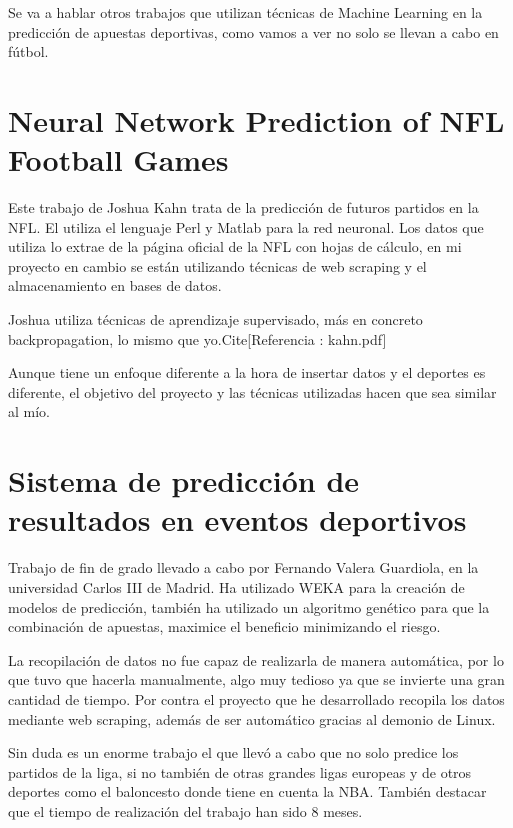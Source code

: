 
Se va a hablar otros trabajos que utilizan técnicas de Machine Learning en la predicción de apuestas deportivas, como vamos a ver no solo se llevan a cabo en fútbol.

\section{Neural Network Prediction of NFL Football Games}

Este trabajo de Joshua Kahn trata de la predicción de futuros partidos en la NFL.
El utiliza el lenguaje Perl y Matlab para la red neuronal. Los datos que utiliza lo extrae de la página oficial de la NFL con hojas de cálculo, en mi proyecto en cambio se están utilizando técnicas de web scraping y el almacenamiento en bases de datos.

Joshua utiliza técnicas de aprendizaje supervisado, más en concreto backpropagation, lo mismo que yo.Cite[Referencia : kahn.pdf]

Aunque tiene un enfoque diferente a la hora de insertar datos y el deportes es diferente, el objetivo del proyecto y las técnicas utilizadas hacen que sea similar al mío.

\section{Sistema de predicción de resultados en eventos deportivos}

Trabajo de fin de grado llevado a cabo por Fernando Valera Guardiola, en la universidad Carlos III de Madrid. Ha utilizado WEKA para la creación de modelos de predicción, también ha utilizado un algoritmo genético para que la combinación de apuestas, maximice el beneficio minimizando el riesgo.

La recopilación de datos no fue capaz de realizarla de manera automática, por lo que tuvo que hacerla manualmente, algo muy tedioso ya que se invierte una gran cantidad de tiempo. Por contra el proyecto que he desarrollado recopila los datos mediante web scraping, además de ser automático gracias al demonio de Linux.

Sin duda es un enorme trabajo el que llevó a cabo que no solo predice los partidos de la liga, si no también de otras grandes ligas europeas y de otros deportes como el baloncesto donde tiene en cuenta la NBA. También destacar que el tiempo de realización del trabajo han sido 8 meses.